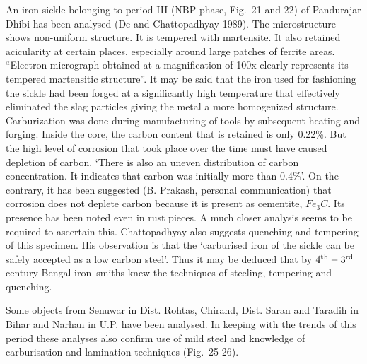 An iron sickle belonging to period III (NBP phase, Fig.~21 and 22) of Pandurajar Dhibi has been analysed (De and Chattopadhyay 1989). The microstructure shows non-uniform structure. It is tempered with martensite. It also retained acicularity at certain places, especially around large patches of ferrite areas. “Electron micrograph obtained at a magnification of 100x clearly represents its tempered martensitic structure”. It may be said that the iron used for fashioning the sickle had been forged at a significantly high temperature that effectively eliminated the slag particles giving the metal a more homogenized structure. Carburization was done during manufacturing of tools by subsequent heating and forging. Inside the core, the carbon content that is retained is only 0.22\%. But the high level of corrosion that took place over the time must have caused depletion of carbon. ‘There is also an uneven distribution of carbon concentration. It indicates that carbon was initially more than 0.4\%’. On the contrary, it has been suggested (B. Prakash, personal communication) that corrosion does not deplete carbon because it is present as cementite, $Fe_3C$. Its presence has been noted even in rust pieces. A much closer analysis seems to be required to ascertain this. Chattopadhyay also suggests quenching and tempering of this specimen. His observation is that the ‘carburised iron of the sickle can be safely accepted as a low carbon steel’. Thus it may be deduced that by $4^{\rm th}-3^{\rm rd}$ century Bengal iron–smiths knew the techniques of steeling, tempering and quenching.

Some objects from Senuwar in Dist. Rohtas, Chirand, Dist. Saran and Taradih in Bihar and Narhan in U.P. have been analysed. In keeping with the trends of this period these analyses also confirm use of mild steel and knowledge of carburisation and lamination techniques (Fig.~25-26). 




